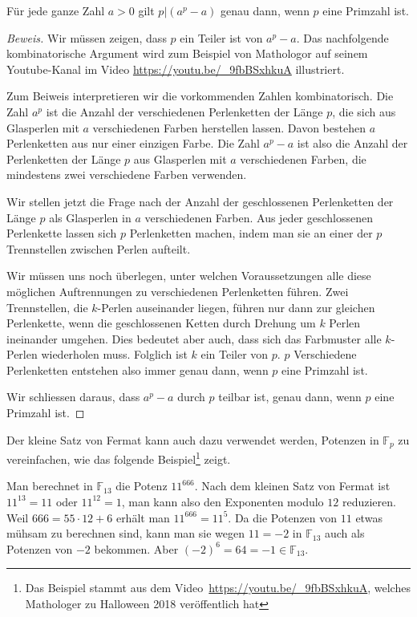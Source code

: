 \begin{satz}
Für jede ganze Zahl $a>0$ gilt $p|(a^p-a)$ genau dann, wenn
$p$ eine Primzahl ist.
\end{satz}

\begin{proof}[Beweis]
Wir müssen zeigen, dass $p$ ein Teiler ist von $a^p-a$.
Das nachfolgende kombinatorische Argument wird zum Beispiel
von Mathologor auf seinem Youtube-Kanal im Video
\url{https://youtu.be/_9fbBSxhkuA} illustriert.

Zum Beiweis interpretieren wir die vorkommenden Zahlen kombinatorisch.
Die Zahl $a^p$ ist die Anzahl der verschiedenen Perlenketten der Länge
$p$, die sich aus Glasperlen mit $a$ verschiedenen Farben herstellen
lassen.
Davon bestehen $a$ Perlenketten aus nur einer einzigen Farbe.
Die Zahl $a^p-a$ ist also die Anzahl der Perlenketten der Länge $p$
aus Glasperlen mit $a$ verschiedenen Farben, die mindestens zwei
verschiedene Farben verwenden.

Wir stellen jetzt die Frage nach der Anzahl der geschlossenen
Perlenketten der Länge $p$ als Glasperlen in $a$ verschiedenen Farben.
Aus jeder geschlossenen Perlenkette lassen sich $p$ Perlenketten machen,
indem man sie an einer der $p$ Trennstellen zwischen Perlen aufteilt.

Wir müssen uns noch überlegen, unter welchen Voraussetzungen 
alle diese möglichen Auftrennungen zu verschiedenen Perlenketten
führen.
Zwei Trennstellen, die $k$-Perlen auseinander liegen, führen nur dann
zur gleichen Perlenkette, wenn die geschlossenen Ketten durch Drehung 
um $k$ Perlen ineinander umgehen.
Dies bedeutet aber auch, dass sich das Farbmuster alle $k$-Perlen
wiederholen muss.
Folglich ist $k$ ein Teiler von $p$.
$p$ Verschiedene Perlenketten entstehen also immer genau dann, wenn $p$
eine Primzahl ist.

Wir schliessen daraus, dass $a^p-a$ durch $p$ teilbar ist, genau dann,
wenn $p$ eine Primzahl ist.
\end{proof}

Der kleine Satz von Fermat kann auch dazu verwendet werden, Potenzen 
in $\mathbb{F}_p$ zu vereinfachen, wie das folgende Beispiel\footnote{%
Das Beispiel stammt aus dem Video~\url{https://youtu.be/_9fbBSxhkuA},
welches Mathologer zu Halloween 2018 veröffentlich hat}
zeigt.

\begin{beispiel}
Man berechnet in $\mathbb{F}_{13}$ die Potenz $11^{666}$.
Nach dem kleinen Satz von Fermat ist $11^{13} = 11$ oder $11^{12}=1$,
man kann also den Exponenten modulo $12$ reduzieren.
Weil $666=55\cdot 12 + 6$ erhält man $11^{666}= 11^5$.
Da die Potenzen von $11$ etwas mühsam zu berechnen sind,
kann man sie wegen $11=-2$ in $\mathbb{F}_{13}$ auch als Potenzen
von $-2$ bekommen.
Aber $(-2)^6 = 64 = -1 \in\mathbb{F}_{13}$.
\end{beispiel}


